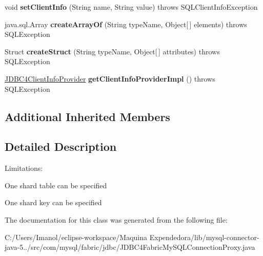 \begin{DoxyCompactItemize}
void {\bfseries set\+Client\+Info} (String name, String value)  throws S\+Q\+L\+Client\+Info\+Exception 
\item 
\mbox{\label{classcom_1_1mysql_1_1fabric_1_1jdbc_1_1_j_d_b_c4_fabric_my_s_q_l_connection_proxy_adf003e7fdb4ce085b123db3b107c8266}} 
java.\+sql.\+Array {\bfseries create\+Array\+Of} (String type\+Name, Object\mbox{[}$\,$\mbox{]} elements)  throws S\+Q\+L\+Exception 
\item 
\mbox{\label{classcom_1_1mysql_1_1fabric_1_1jdbc_1_1_j_d_b_c4_fabric_my_s_q_l_connection_proxy_a1f57ca324a0c52d2ec71c20f659f92ba}} 
Struct {\bfseries create\+Struct} (String type\+Name, Object\mbox{[}$\,$\mbox{]} attributes)  throws S\+Q\+L\+Exception 
\item 
\mbox{\label{classcom_1_1mysql_1_1fabric_1_1jdbc_1_1_j_d_b_c4_fabric_my_s_q_l_connection_proxy_a0d1002b319f67e879df508d1624212a1}} 
\mbox{\hyperlink{interfacecom_1_1mysql_1_1jdbc_1_1_j_d_b_c4_client_info_provider}{J\+D\+B\+C4\+Client\+Info\+Provider}} {\bfseries get\+Client\+Info\+Provider\+Impl} ()  throws S\+Q\+L\+Exception 
\end{DoxyCompactItemize}
\subsection*{Additional Inherited Members}


\subsection{Detailed Description}
Limitations\+: 
\begin{DoxyItemize}
\item One shard table can be specified 
\item One shard key can be specified 
\end{DoxyItemize}

The documentation for this class was generated from the following file\+:\begin{DoxyCompactItemize}
\item 
C\+:/\+Users/\+Imanol/eclipse-\/workspace/\+Maquina Expendedora/lib/mysql-\/connector-\/java-\/5../src/com/mysql/fabric/jdbc/J\+D\+B\+C4\+Fabric\+My\+S\+Q\+L\+Connection\+Proxy.\+java\end{DoxyCompactItemize}
